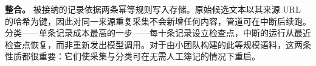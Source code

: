 \documentclass[11pt]{article}
\begin{document}
\textbf{{\cjkfont 整\allowbreak 合\allowbreak 。}} {\cjkfont 被\allowbreak 接\allowbreak 纳\allowbreak 的\allowbreak 记\allowbreak 录\allowbreak 依\allowbreak 据\allowbreak 两\allowbreak 条\allowbreak 幂\allowbreak 等\allowbreak 规\allowbreak 则\allowbreak 写\allowbreak 入\allowbreak 存\allowbreak 储\allowbreak 。\allowbreak 原\allowbreak 始\allowbreak 候\allowbreak 选\allowbreak 文\allowbreak 本\allowbreak 以\allowbreak 其\allowbreak 来\allowbreak 源} URL {\cjkfont 的\allowbreak 哈\allowbreak 希\allowbreak 为\allowbreak 键\allowbreak ，\allowbreak 因\allowbreak 此\allowbreak 对\allowbreak 同\allowbreak 一\allowbreak 来\allowbreak 源\allowbreak 重\allowbreak 复\allowbreak 采\allowbreak 集\allowbreak 不\allowbreak 会\allowbreak 新\allowbreak 增\allowbreak 任\allowbreak 何\allowbreak 内\allowbreak 容\allowbreak ，\allowbreak 管\allowbreak 道\allowbreak 可\allowbreak 在\allowbreak 中\allowbreak 断\allowbreak 后\allowbreak 续\allowbreak 跑\allowbreak 。\allowbreak 分\allowbreak 类}------{\cjkfont 单\allowbreak 条\allowbreak 记\allowbreak 录\allowbreak 成\allowbreak 本\allowbreak 最\allowbreak 高\allowbreak 的\allowbreak 一\allowbreak 步}------{\cjkfont 每\allowbreak 十\allowbreak 条\allowbreak 记\allowbreak 录\allowbreak 设\allowbreak 立\allowbreak 检\allowbreak 查\allowbreak 点\allowbreak ，\allowbreak 中\allowbreak 断\allowbreak 的\allowbreak 运\allowbreak 行\allowbreak 从\allowbreak 最\allowbreak 近\allowbreak 检\allowbreak 查\allowbreak 点\allowbreak 恢\allowbreak 复\allowbreak ，\allowbreak 而\allowbreak 非\allowbreak 重\allowbreak 新\allowbreak 发\allowbreak 出\allowbreak 模\allowbreak 型\allowbreak 调\allowbreak 用\allowbreak 。\allowbreak 对\allowbreak 于\allowbreak 由\allowbreak 小\allowbreak 团\allowbreak 队\allowbreak 构\allowbreak 建\allowbreak 的\allowbreak 此\allowbreak 等\allowbreak 规\allowbreak 模\allowbreak 语\allowbreak 料\allowbreak ，\allowbreak 这\allowbreak 两\allowbreak 条\allowbreak 性\allowbreak 质\allowbreak 都\allowbreak 很\allowbreak 重\allowbreak 要\allowbreak ：\allowbreak 它\allowbreak 们\allowbreak 使\allowbreak 采\allowbreak 集\allowbreak 与\allowbreak 分\allowbreak 类\allowbreak 可\allowbreak 在\allowbreak 无\allowbreak 需\allowbreak 人\allowbreak 工\allowbreak 簿\allowbreak 记\allowbreak 的\allowbreak 情\allowbreak 况\allowbreak 下\allowbreak 重\allowbreak 启\allowbreak 。}
\end{document}
